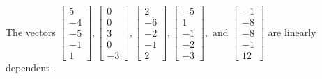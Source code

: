 \begin{exercise}
\begin{exerciseStatement}
  \end{exerciseStatement}
  \begin{exerciseAnswer}
   The vectors \(\left[\begin{array}{r}
5 \\
-4 \\
-5 \\
-1 \\
1
\end{array}\right] , \left[\begin{array}{r}
0 \\
0 \\
3 \\
0 \\
-3
\end{array}\right] , \left[\begin{array}{r}
2 \\
-6 \\
-2 \\
-1 \\
2
\end{array}\right] , \left[\begin{array}{r}
-5 \\
1 \\
-1 \\
-2 \\
-3
\end{array}\right] , \text{ and } \left[\begin{array}{r}
-1 \\
-8 \\
-8 \\
-1 \\
12
\end{array}\right]\) are 
  	 linearly dependent  .
  


  \end{exerciseAnswer}
\end{exercise}
